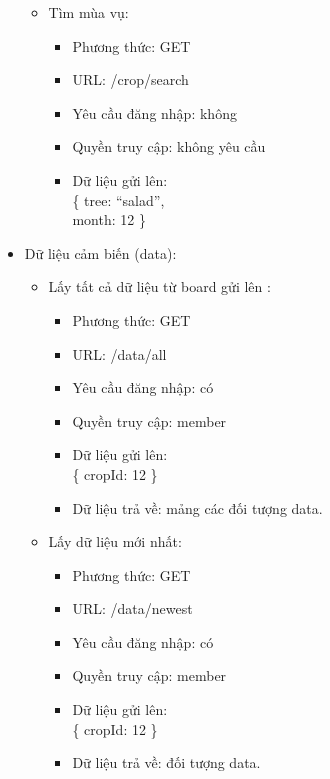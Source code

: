 \documentclass[a4paper,12pt,oneside]{article}
\begin{document}
\begin{itemize}
\begin{itemize}
\item Tìm mùa vụ:
	\begin{itemize}
	\item Phương thức: GET
	\item URL: /crop/search
	\item Yêu cầu đăng nhập: không
	\item Quyền truy cập: không yêu cầu
	\item Dữ liệu gửi lên:\\ 
		\{
			tree: “salad”,\\
			month: 12
		\}
	\end{itemize}
\end{itemize}
\item Dữ liệu cảm biến (data):

\begin{itemize}
\item Lấy tất cả dữ liệu từ board gửi lên :
	\begin{itemize}
	\item Phương thức: GET
	\item URL: /data/all
	\item Yêu cầu đăng nhập: có
	\item Quyền truy cập: member
	\item Dữ liệu gửi lên:\\ 
		\{
			cropId: 12
		\}
	\item Dữ liệu trả về: mảng các đối tượng data.
	\end{itemize}
	
\item Lấy dữ liệu mới nhất:
	\begin{itemize}
	\item Phương thức: GET
	\item URL: /data/newest
	\item Yêu cầu đăng nhập: có
	\item Quyền truy cập: member
	\item Dữ liệu gửi lên:\\ 
		\{
			cropId: 12
		\}
	\item Dữ liệu trả về: đối tượng data.
	\end{itemize}
\end{itemize}

\end{itemize}
\end{document}
